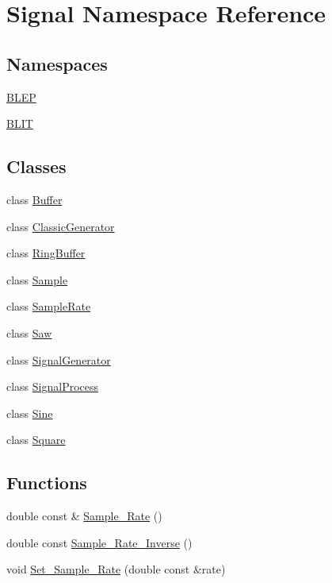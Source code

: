 \hypertarget{namespaceSignal}{\section{Signal Namespace Reference}
\label{namespaceSignal}
}
\subsection*{Namespaces}
\begin{DoxyCompactItemize}
\item 
 \hyperlink{namespaceSignal_1_1BLEP}{B\+L\+E\+P}
\item 
 \hyperlink{namespaceSignal_1_1BLIT}{B\+L\+I\+T}
\end{DoxyCompactItemize}
\subsection*{Classes}
\begin{DoxyCompactItemize}
\item 
class \hyperlink{classSignal_1_1Buffer}{Buffer}
\item 
class \hyperlink{classSignal_1_1ClassicGenerator}{Classic\+Generator}
\item 
class \hyperlink{classSignal_1_1RingBuffer}{Ring\+Buffer}
\item 
class \hyperlink{classSignal_1_1Sample}{Sample}
\item 
class \hyperlink{classSignal_1_1SampleRate}{Sample\+Rate}
\item 
class \hyperlink{classSignal_1_1Saw}{Saw}
\item 
class \hyperlink{classSignal_1_1SignalGenerator}{Signal\+Generator}
\item 
class \hyperlink{classSignal_1_1SignalProcess}{Signal\+Process}
\item 
class \hyperlink{classSignal_1_1Sine}{Sine}
\item 
class \hyperlink{classSignal_1_1Square}{Square}
\end{DoxyCompactItemize}
\subsection*{Functions}
\begin{DoxyCompactItemize}
\item 
double const \& \hyperlink{namespaceSignal_ae7b1f222afc010e0f33f306f978fcde9}{Sample\+\_\+\+Rate} ()
\item 
double const \hyperlink{namespaceSignal_ae7e8bbfcac6571aaaf18d7f96f3fefc3}{Sample\+\_\+\+Rate\+\_\+\+Inverse} ()
\item 
void \hyperlink{namespaceSignal_a2f163a7bbf1b0fc76ceba8b0916a7890}{Set\+\_\+\+Sample\+\_\+\+Rate} (double const \&rate)
\end{DoxyCompactItemize}
